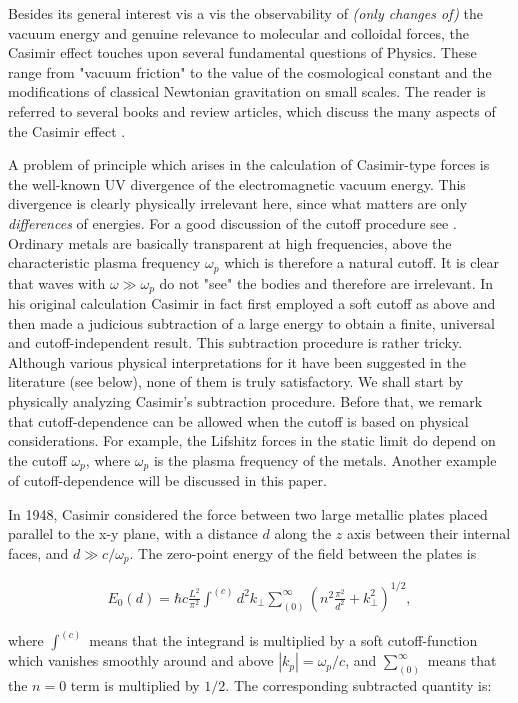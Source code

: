 \documentclass[prl,nofootinbib,twocolumn,showpacs]{revtex4}
\def\bq{\begin{eqnarray}}
\def\ee{\end{eqnarray}}
\begin{document}
Besides its general interest vis a vis the observability of {\em
(only changes of)} the vacuum energy \cite{rem} and genuine relevance to
molecular and colloidal forces, the Casimir effect touches upon
several fundamental questions of Physics. These range from "vacuum
friction" to the value of the cosmological constant and the modifications of
classical Newtonian gravitation on small scales. The reader is
referred to several books and review articles,
which discuss the many aspects of the Casimir effect
\cite{Milonni-book,Most-book,Bord-Phys-Rep,B-G,P-M-G,Milton}.

A problem of principle which arises in the calculation of Casimir-type forces is the
well-known UV divergence of the electromagnetic vacuum energy. This divergence is clearly
physically irrelevant here, since what matters are only {\em differences} of energies.
For a good discussion of the cutoff procedure see \cite{cardy}. Ordinary metals are
basically transparent at high frequencies,  above the characteristic plasma frequency
$\omega_p$ which is therefore a natural cutoff. It is clear that waves with $\omega \gg
\omega_p$ do not "see"  the bodies and therefore are irrelevant. In his original
calculation Casimir in fact first employed a soft cutoff as above and then made a
judicious subtraction of a large energy to obtain a finite, universal and
cutoff-independent result. This subtraction procedure is rather tricky. Although various
physical interpretations for it have been suggested in the literature (see below), none
of them is truly satisfactory.  We shall start by physically analyzing Casimir's
subtraction procedure. Before that, we remark that cutoff-dependence can be allowed when
the cutoff is based on physical considerations. For example, the Lifshitz forces in the
static limit do depend on the cutoff $\omega_p$, where $\omega_p$ is the plasma frequency
of the metals. Another example of cutoff-dependence will be discussed in this paper.

In 1948, Casimir \cite{Casimir} considered the force between two large metallic plates
placed parallel to the x-y plane, with a distance $d$ along the $z$ axis between their
internal faces, and $d \gg c/ \omega_p$. The zero-point energy of the field between the
plates is

\bq E_0(d) = \hbar c \frac{L^2}{\pi^2}\int^{(c)} d^2 k_\bot \sum_{(0)} ^\infty (n^2
\frac{\pi^2} {d^2} +  k_\bot ^2)^{1/2}, \label{E} \ee

\noindent where $\int^{(c)}$ means that the integrand is multiplied by a soft
cutoff-function which vanishes smoothly around and above $|k_p| = \omega_p / c$, and $\sum_{(0)}
^\infty$ means that the $n = 0$ term is multiplied by $1/2$. The corresponding subtracted
quantity is:
\end{document}
